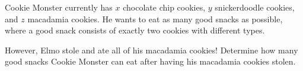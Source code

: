 Cookie Monster currently has $x$ chocolate chip cookies, $y$ snickerdoodle cookies, and $z$ macadamia cookies. He wants to eat as many good snacks as possible, where a good snack consists of exactly two cookies with different types. 

However, Elmo stole and ate all of his macadamia cookies! Determine how many good snacks Cookie Monster can eat after having his macadamia cookies stolen.
